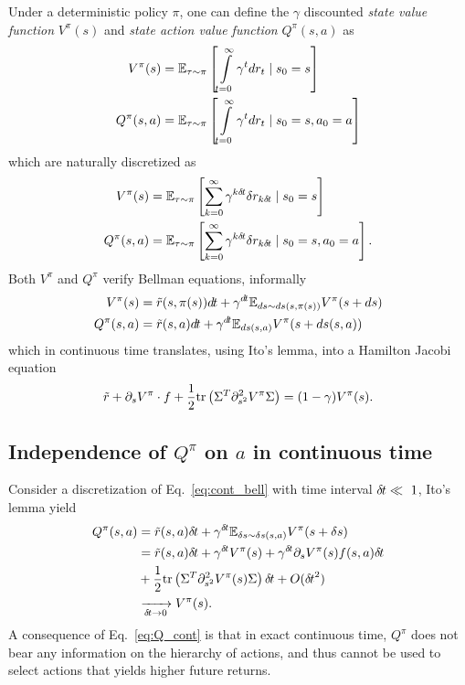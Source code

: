 Under a deterministic policy $\pi$, one can define the $\gamma$ discounted
\emph{state value function} $V^\pi(s)$ and \emph{state action value function}
$Q^\pi(s, a)$ as
\begin{align}
	V^\pi(s) &= \mathbb{E}_{\tau\sim\pi}\left[
		\int\limits_{t=0}^\infty \gamma^{t}
		dr_{t} \mid s_0 = s
	\right]\\
	Q^\pi(s, a) &= \mathbb{E}_{\tau\sim\pi}\left[
		\int\limits_{t=0}^\infty \gamma^{t}
		dr_{t} \mid s_0 = s, a_0 = a
	\right]
\end{align}
which are naturally discretized as
\begin{align}
	V^\pi(s) &= \mathbb{E}_{\tau\sim\pi}\left[
		\sum\limits_{k=0}^\infty \gamma^{k{\delta\hspace{-.1em}t}}
		\delta r_{k{\delta\hspace{-.1em}t}} \mid s_0 = s
	\right]\\
	Q^\pi(s, a) &= \mathbb{E}_{\tau\sim\pi}\left[
		\sum\limits_{k=0}^\infty \gamma^{k{\delta\hspace{-.1em}t}}
		\delta r_{k{\delta\hspace{-.1em}t}} \mid s_0 = s, a_0 = a
	\right].
\end{align}
Both $V^\pi$ and $Q^\pi$ verify Bellman equations, informally
\begin{align}
	V^\pi(s) &= \tilde{r}(s, \pi(s))d\hspace{-.1em}t + \gamma^{d\hspace{-.1em}t} \mathbb{E}_{ds \sim ds(s, \pi(s))} V^\pi(s + ds)\nonumber\\
	Q^\pi(s, a) &= \tilde{r}(s, a)d\hspace{-.1em}t + \gamma^{d\hspace{-.1em}t} \mathbb{E}_{ds(s, a)} V^\pi(s + ds(s, a))
	\label{eq:cont_bell}
\end{align}
which in continuous time translates, using Ito's lemma, into a Hamilton Jacobi equation
\begin{align}
	\tilde{r} + \partial_s V^\pi \cdot f + \frac{1}{2} \text{tr}\left(\Sigma^T\partial^2_{s^2} V^\pi\Sigma\right) = (1 - \gamma) V^\pi(s).
\end{align}

\subsection{Independence of $Q^\pi$ on $a$ in continuous time}
Consider a discretization of Eq.~\eqref{eq:cont_bell} with time interval
${\delta\hspace{-.1em}t} \ll~1$, Ito's lemma yield
\begin{align}
	Q^\pi(s, a) &= \tilde{r}(s, a) {\delta\hspace{-.1em}t} + \gamma^{{\delta\hspace{-.1em}t}} \mathbb{E}_{\delta s \sim \delta s(s, a)}V^\pi(s + \delta s)\nonumber\\
		    &= \tilde{r}(s, a) {\delta\hspace{-.1em}t} + \gamma^{{\delta\hspace{-.1em}t}} V^\pi(s) +
		     \gamma^{{\delta\hspace{-.1em}t}} \partial_s V^\pi(s)f(s, a) {\delta\hspace{-.1em}t}\nonumber\\
		    &+ \frac{1}{2}\text{tr}\left(\Sigma^T\partial^2_{s^2}V^\pi(s)\Sigma\right){\delta\hspace{-.1em}t} + O({\delta\hspace{-.1em}t}^2)\nonumber\\
		    &\xrightarrow[{\delta\hspace{-.1em}t} \to 0]{} V^\pi(s).
		    \label{eq:Q_cont}
\end{align}
A consequence of Eq.~\eqref{eq:Q_cont} is that in exact continuous time,
$Q^\pi$ does not bear any information on the hierarchy of actions, and
thus cannot be used to select actions that yields higher future returns.

